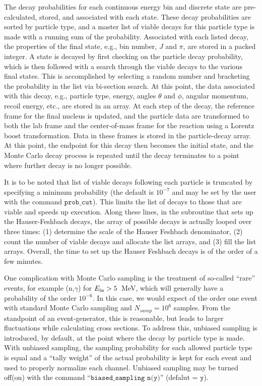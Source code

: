 \documentclass[
10pt,
showpacs,preprintnumbers,footinbib,
amsfonts,amsmath,amssymb,
aps,
prc,twocolumn,groupedaddress,superscriptaddress,
showkeys,
nofootinbib
]{revtex4-1}
\begin{document}
The decay probabilities for each continuous energy bin and discrete state are pre-calculated, stored, and associated with each state. These decay probabilities are sorted by particle type, and a master list of viable decays for this particle type is made with a running sum of the probability. Associated with each listed decay, the properties of the final state, e.g., bin number, $J$ and $\pi$, are stored in a packed integer. A state is decayed by first checking on the particle decay probability, which is then followed with a search through the viable decays to the various final states. This is accomplished by selecting a random number and bracketing the probability in the list via bi-section search. At this point, the data associated with this decay, e.g., particle type, energy, angles $\theta$ and $\phi$, angular momentum, recoil energy, etc., are stored in an array. At each step of the decay, the reference frame for the final nucleus is updated, and the particle data are transformed to both the lab frame and the center-of-mass frame for the reaction using a Lorentz boost transformation. Data in these frames is stored in the particle-decay array. At this point, the endpoint for this decay then becomes the initial state, and the Monte Carlo decay process is repeated until the decay terminates to a point where further decay is no longer possible. 

It is to be noted that list of viable decays following each particle is truncated by specifying a minimum probability (the default is $10^{-7}$ and may be set by the user with the command ${\texttt{prob\_cut}}$). This limits the list of decays to those that are viable and speeds up execution. Along these lines, in the subroutine that sets up the Hauser-Feshbach decays, the array of possible decays is actually looped over three times: (1) determine the scale of the Hauser Feshbach denominator, (2) count the number of viable decays and allocate the list arrays, and (3) fill the list arrays. Overall, the time to set up the Hauser Feshbach decays is of the order of a few minutes.

One complication with Monte Carlo sampling is the treatment of so-called ``rare'' events, for example (n,$\gamma$) for $E_{\rm in} > 5$~MeV, which will generally have a probability of the order $10^{-6}$. In this case, we would expect of the order one event with standard Monte Carlo sampling and $N_{samp}=10^6$ samples. From the standpoint of an event-generator, this is reasonable, but leads to larger fluctuations while calculating cross sections. To address this, unbiased sampling is introduced, by default, at the point where the decay by particle type is made. With unbiased sampling, the sampling probability for each allowed particle type is equal and a ``tally weight'' of the actual probability is kept for each event and used to properly normalize each channel. Unbiased sampling may be turned off(on) with the command ``${\texttt{biased\_sampling n(y)}}$'' (defalut = ${\texttt{y}}$).
\end{document}
